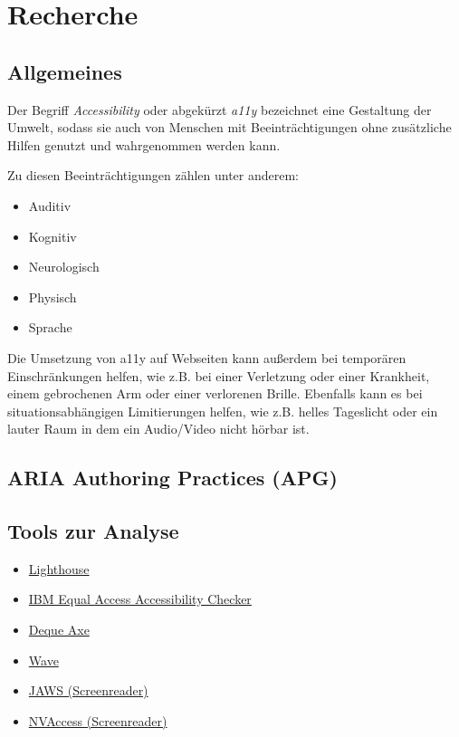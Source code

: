\chapter{Recherche}

\label{Chapter3}

\section{Allgemeines}

Der Begriff \emph{Accessibility} oder abgekürzt \emph{a11y} bezeichnet eine Gestaltung der Umwelt, sodass sie auch von Menschen mit Beeinträchtigungen ohne zusätzliche Hilfen genutzt und wahrgenommen werden kann. \cite{Bundesfachstelle_Barrierefreiheit_a11y_Definition} 

Zu diesen Beeinträchtigungen zählen unter anderem:

\begin{itemize}
    \item Auditiv
    \item Kognitiv
    \item Neurologisch
    \item Physisch
    \item Sprache
\end{itemize}

Die Umsetzung von a11y auf Webseiten kann außerdem bei temporären Einschränkungen helfen, wie z.B. bei einer Verletzung oder einer Krankheit, einem gebrochenen Arm oder einer verlorenen Brille. Ebenfalls kann es bei situationsabhängigen Limitierungen helfen, wie z.B. helles Tageslicht oder ein lauter Raum in dem ein Audio/Video nicht hörbar ist.

\section{ARIA Authoring Practices (APG)}

\section{Tools zur Analyse}

\begin{itemize}
    \item \href{https://developers.google.com/web/tools/lighthouse/#devtools}{Lighthouse}
    \item \href{https://chrome.google.com/webstore/detail/ibm-equal-access-accessib/lkcagbfjnkomcinoddgooolagloogehp?hl=en-US}{IBM Equal Access Accessibility Checker}
    \item \href{https://www.deque.com/axe/}{Deque Axe}
    \item \href{https://wave.webaim.org/extension/}{Wave}
    \item \href{https://support.freedomscientific.com/Downloads/JAWS}{JAWS (Screenreader)}
    \item \href{https://www.nvaccess.org/download/}{NVAccess (Screenreader)}
\end{itemize}


